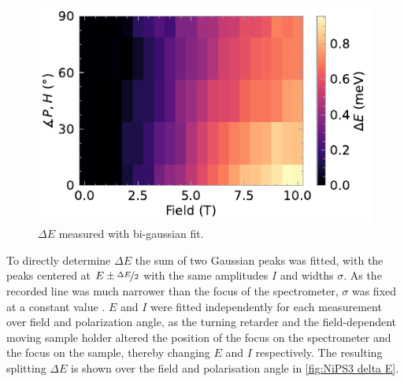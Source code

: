 \documentclass[
	oneside,
	parskip=half,
	a4paper,
]{scrbook}
\begin{document}
\begin{figure}
	\centering
	\includegraphics{../figures/2024-04-21 NiPS3 DeltaE.pdf}
	\caption{$\Delta E$ measured with bi-gaussian fit.}
	\label{fig:NiPS3 delta E}
\end{figure}
To directly determine $\Delta E$ the sum of two Gaussian peaks was fitted, with the peaks centered at $E\pm \nicefrac{\Delta E}{2}$ with the same amplitudes $I$ and widths $\sigma$.
As the recorded line was much narrower than the focus of the spectrometer, $\sigma$ was fixed at a constant value \cite{NiPS3_magnon_gap}.
$E$ and $I$ were fitted independently for each measurement over field and polarization angle, as the turning retarder and the field-dependent moving sample holder altered the position of the focus on the spectrometer and the focus on the sample, thereby changing $E$ and $I$ respectively.
The resulting splitting $\Delta E$ is shown over the field and polarisation angle in \autoref{fig:NiPS3 delta E}.
\end{document}
